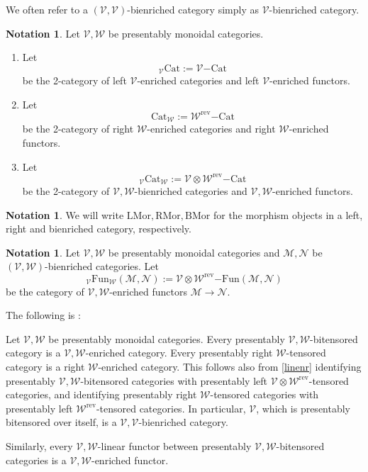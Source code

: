\documentclass[10pt,oneside]{article}
\numberwithin{equation}{section} %
\numberwithin{figure}{section} %
\theoremstyle{plain}
\theoremstyle{definition}
\newtheorem{notation}[thm]{Notation}
\newcommand{\mM}{{\mathcal M}}
\newcommand{\mN}{{\mathcal N}}
\newcommand{\mV}{{\mathcal V}}
\newcommand{\mW}{{\mathcal W}}
\renewcommand{\L}{{\mathrm L}}
\newcommand{\R}{{\mathrm R}}
\newcommand{\rev}{{\mathrm{rev}}}
\newcommand{\ot}{\otimes}
\newcommand{\Cat}{\mathrm{Cat}}
\newcommand{\Fun}{\mathrm{Fun}}
\newcommand{\Mor}{{\mathrm{Mor}}}
\begin{document}
We often refer to a $(\mV,\mV)$-bienriched category simply as $\mV$-bienriched category.

\begin{notation}
Let $\mV, \mW$ be presentably monoidal categories.
\begin{enumerate}[\normalfont(1)]\setlength{\itemsep}{-2pt}
\item Let $${_\mV \Cat}:= {\mV}\mathrm{-}\Cat$$
be the 2-category of left $\mV$-enriched categories and left $\mV$-enriched functors.
\item Let $${\Cat_\mW}:= {\mW^\rev}\mathrm{-}\Cat$$
be the 2-category of right $\mW$-enriched categories and right $\mW$-enriched functors.
\item Let $${_\mV \Cat_\mW}:= {\mV \ot \mW^\rev}\mathrm{-}\Cat$$
be the 2-category of $\mV,\mW$-bienriched categories and $\mV,\mW$-enriched functors.
\end{enumerate}
\end{notation}

\begin{notation}

We will write $\L\Mor, \R\Mor, \mathrm{B}\Mor$ for the morphism objects in a left, right and bienriched category, respectively.    
\end{notation}

\begin{notation}
Let $\mV, \mW$ be presentably monoidal categories and $\mM, \mN$ be $(\mV,\mW)$-bienriched categories.
Let $$_\mV\Fun_\mW(\mM,\mN):= {\mV \ot \mW^\rev \mathrm{-}\Fun(\mM,\mN)}$$ be the category of $\mV,\mW$-enriched functors $\mM \to \mN.$

\end{notation}

The following is \cite[Example 2.134]{heine2024bienriched}:

\begin{example}
Let $\mV,\mW$ be presentably monoidal categories. Every presentably $\mV,\mW$-bitensored category is a $\mV,\mW$-enriched category.
Every presentably right $\mW$-tensored category is a right $\mW$-enriched category.
This follows also from \cref{linenr} identifying
presentably $\mV,\mW$-bitensored categories with presentably left $\mV \ot \mW^\rev$-tensored categories, and identifying
presentably right $\mW$-tensored categories with presentably left $\mW^\rev$-tensored categories.
In particular, $\mV$, which is presentably bitensored over itself, is a $\mV,\mV$-bienriched category.

Similarly, every $\mV,\mW$-linear functor between presentably $\mV,\mW$-bitensored categories is a $\mV,\mW$-enriched functor.

\end{example}
\end{document}
